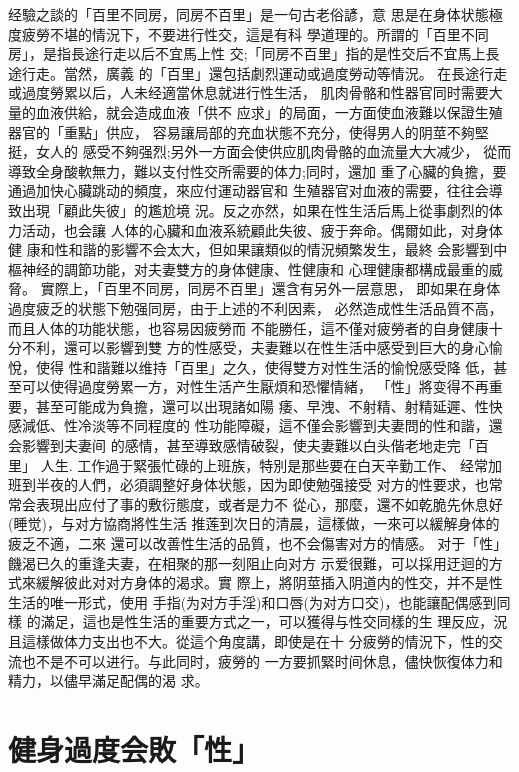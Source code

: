 \documentclass[12pt,UTF8]{ctexbook}
\begin{document}
经驗之談的「百里不同房，同房不百里」是一句古老俗諺，意
思是在身体状態極度疲勞不堪的情況下，不要进行性交，這是有科
學道理的。所謂的「百里不同房」，是指長途行走以后不宜馬上性
交;「同房不百里」指的是性交后不宜馬上長途行走。當然，廣義
的「百里」還包括劇烈運动或過度勞动等情況。
在長途行走或過度勞累以后，人未经適當休息就进行性生活，
肌肉骨骼和性器官同时需要大量的血液供給，就会造成血液「供不
应求」的局面，一方面使血液難以保證生殖器官的「重點」供应，
容易讓局部的充血状態不充分，使得男人的阴莖不夠堅挺，女人的
感受不夠强烈;另外一方面会使供应肌肉骨骼的血流量大大减少，
從而導致全身酸軟無力，難以支付性交所需要的体力;同时，還加
重了心臟的負擔，要通過加快心臟跳动的頻度，來应付運动器官和
生殖器官对血液的需要，往往会導致出現「顧此失彼」的尷尬境
況。反之亦然，如果在性生活后馬上從事劇烈的体力活动，也会讓
人体的心臟和血液系統顧此失彼、疲于奔命。偶爾如此，对身体健
康和性和諧的影響不会太大，但如果讓類似的情況頻繁发生，最終
会影響到中樞神经的調節功能，对夫妻雙方的身体健康、性健康和
心理健康都構成最重的威脅。
實際上，「百里不同房，同房不百里」還含有另外一层意思，
即如果在身体過度疲乏的状態下勉强同房，由于上述的不利因素，
必然造成性生活品質不高，而且人体的功能状態，也容易因疲勞而
不能勝任，這不僅对疲勞者的自身健康十分不利，還可以影響到雙
方的性感受，夫妻難以在性生活中感受到巨大的身心愉悅，使得
性和諧難以维持「百里」之久，使得雙方对性生活的愉悅感受降
低，甚至可以使得過度勞累一方，对性生活产生厭煩和恐懼情緒，
「性」將变得不再重要，甚至可能成为負擔，還可以出現諸如陽
痿、早洩、不射精、射精延遲、性快感減低、性冷淡等不同程度的
性功能障礙，這不僅会影響到夫妻問的性和諧，還会影響到夫妻间
的感情，甚至導致感情破裂，使夫妻難以白头偕老地走完「百里」
人生.
工作過于緊張忙碌的上班族，特別是那些要在白天辛勤工作、
经常加班到半夜的人們，必須調整好身体状態，因为即使勉强接受
对方的性要求，也常常会表現出应付了事的敷衍態度，或者是力不
從心，那麼，還不如乾脆先休息好(睡觉)，与对方協商將性生活
推莲到次日的清晨，這樣做，一來可以緩解身体的疲乏不適，二來
還可以改善性生活的品質，也不会傷害对方的情感。
对于「性」饑渴已久的重逢夫妻，在相聚的那一刻阻止向对方
示爱很難，可以採用迂迴的方式來緩解彼此对对方身体的渴求。實
際上，將阴莖插入阴道内的性交，并不是性生活的唯一形式，使用
手指(为对方手淫)和口唇(为对方口交)，也能讓配偶感到同樣
的滿足，這也是性生活的重要方式之一，可以獲得与性交同樣的生
理反应，況且這樣做体力支出也不大。從這个角度講，即使是在十
分疲勞的情況下，性的交流也不是不可以进行。与此同时，疲勞的
一方要抓緊时间休息，儘快恢復体力和精力，以儘早滿足配偶的渴
求。

\section{健身過度会敗「性」}
\end{document}
